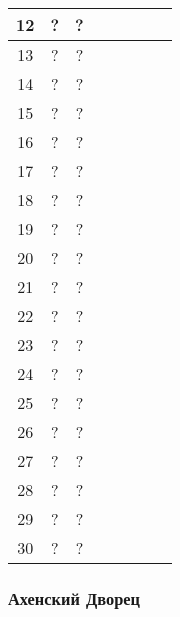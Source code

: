 \begin{longtable}[c]{|c|c|c|c|c|c|c|c|}
    \multirow{1}{*}{12} & \multirow{1}{*}{?} & \multirow{1}{*}{?} & & & & & \\\hline
    \multirow{1}{*}{13} & \multirow{1}{*}{?} & \multirow{1}{*}{?} & & & & & \\\hline
    \multirow{1}{*}{14} & \multirow{1}{*}{?} & \multirow{1}{*}{?} & & & & & \\\hline
    \multirow{1}{*}{15} & \multirow{1}{*}{?} & \multirow{1}{*}{?} & & & & & \\\hline
    \multirow{1}{*}{16} & \multirow{1}{*}{?} & \multirow{1}{*}{?} & & & & & \\\hline
    \multirow{1}{*}{17} & \multirow{1}{*}{?} & \multirow{1}{*}{?} & & & & & \\\hline
    \multirow{1}{*}{18} & \multirow{1}{*}{?} & \multirow{1}{*}{?} & & & & & \\\hline
    \multirow{1}{*}{19} & \multirow{1}{*}{?} & \multirow{1}{*}{?} & & & & & \\\hline
    \multirow{1}{*}{20} & \multirow{1}{*}{?} & \multirow{1}{*}{?} & & & & & \\\hline
    \multirow{1}{*}{21} & \multirow{1}{*}{?} & \multirow{1}{*}{?} & & & & & \\\hline
    \multirow{1}{*}{22} & \multirow{1}{*}{?} & \multirow{1}{*}{?} & & & & & \\\hline
    \multirow{1}{*}{23} & \multirow{1}{*}{?} & \multirow{1}{*}{?} & & & & & \\\hline
    \multirow{1}{*}{24} & \multirow{1}{*}{?} & \multirow{1}{*}{?} & & & & & \\\hline
    \multirow{1}{*}{25} & \multirow{1}{*}{?} & \multirow{1}{*}{?} & & & & & \\\hline
    \multirow{1}{*}{26} & \multirow{1}{*}{?} & \multirow{1}{*}{?} & & & & & \\\hline
    \multirow{1}{*}{27} & \multirow{1}{*}{?} & \multirow{1}{*}{?} & & & & & \\\hline
    \multirow{1}{*}{28} & \multirow{1}{*}{?} & \multirow{1}{*}{?} & & & & & \\\hline
    \multirow{1}{*}{29} & \multirow{1}{*}{?} & \multirow{1}{*}{?} & & & & & \\\hline
    \multirow{1}{*}{30} & \multirow{1}{*}{?} & \multirow{1}{*}{?} & & & & & \\\hline
\end{longtable}


\subsubsection{Ахенский Дворец}

